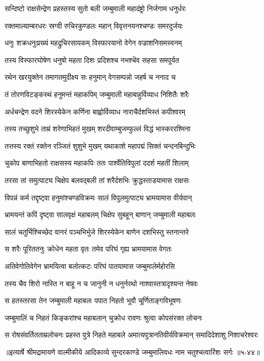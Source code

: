 
\twolineshloka
{सन्दिष्टो राक्षसेन्द्रेण प्रहस्तस्य सुतो बली}
{जम्बुमाली महादंष्ट्रो निर्जगाम धनुर्धरः} %

\twolineshloka
{रक्तमाल्याम्बरधरः स्रग्वी रुचिरकुण्डलः}
{महान् विवृत्तनयनश्चण्डः समरदुर्जयः} %

\twolineshloka
{धनुः शक्रधनुःप्रख्यं महद्रुचिरसायकम्}
{विस्फारयानो वेगेन वज्राशनिसमस्वनम्} %

\twolineshloka
{तस्य विस्फारघोषेण धनुषो महता दिशः}
{प्रदिशश्च नभश्चॆव सहसा समपूर्यत} %

\twolineshloka
{रथेन खरयुक्तेन तमागतमुदीक्ष्य सः}
{हनुमान् वेगसम्पन्नो जहर्ष च ननाद च} %

\twolineshloka
{तं तोरणविटङ्कस्थं हनुमन्तं महाकपिम्}
{जम्बुमाली महाबाहुर्विव्याध निशितैः शरैः} %

\twolineshloka
{अर्धचन्द्रेण वदने शिरस्येकेन कर्णिना}
{बाह्वोर्विव्याध नाराचैर्दशभिस्तं कपीश्वरम्} %

\twolineshloka
{तस्य तच्छुशुभे ताम्रं शरेणाभिहतं मुखम्}
{शरदीवाम्बुजम्फुल्लं विद्धं भास्कररश्मिना} %

\twolineshloka
{तत्तस्य रक्तं रक्तेन रञ्जितं शुशुभे मुखम्}
{यथाकाशे महापद्मं सिक्तं चन्दनबिन्दुभिः} %

\twolineshloka
{चुकोप बाणाभिहतो राक्षसस्य महाकपिः}
{ततः पार्श्वेतिविपुलां ददर्श महतीं शिलाम्} %

\twolineshloka
{तरसा तां समुत्पाट्य चिक्षेप बलवद्बली}
{तां शरैर्दशभिः क्रुद्धस्ताडयामास राक्षसः} %

\twolineshloka
{विपन्नं कर्म तद्दृष्ट्वा हनुमांश्चण्डविक्रमः}
{सालं विपुलमुत्पाट्य भ्रामयामास वीर्यवान्} %

\twolineshloka
{भ्रामयन्तं कपिं दृष्ट्वा सालवृक्षं महाबलम्}
{चिक्षेप सुबहून् बाणान् जम्बुमाली महाबलः} %

\twolineshloka
{सालं चतुर्भिश्चिच्छेद वानरं पञ्चभिर्भुजे}
{शिरस्येकेन बाणेन दशभिस्तु स्तनान्तरे} %

\twolineshloka
{स शरैः पूरिततनुः क्रोधेन महता वृतः}
{तमेव परिघं गृह्य भ्रामयामास वेगतः} %

\twolineshloka
{अतिवेगोतिवेगेन भ्रामयित्वा बलोत्कटः}
{परिघं पातयामास जम्बुमालेर्महोरसि} %

\twolineshloka
{तस्य चैव शिरो नास्ति न बाहू न च जानुनी}
{न धनुर्नरथो नाश्वास्तत्रादृश्यन्त नेषवः} %

\twolineshloka
{स हतस्तरसा तेन जम्बुमाली महाबलः}
{पपात निहतो भूवौ चूर्णिताङ्गविभूषणः} %

\twolineshloka
{जम्बुमालिं च निहतं किङ्करांश्च महाबलान्}
{चुक्रोध रावणः श्रुत्वा कोपसंरक्त लोचनः} %

\twolineshloka
{स रोषसंवर्तितताम्रलोचनः प्रहस्त पुत्रे निहते महाबले}
{अमात्यपुत्रानतिवीर्यविक्रमान् समादिदेशाशु निशाचरेश्वरः} %


॥इत्यार्षे श्रीमद्रामायणे वाल्मीकीये आदिकाव्ये सुन्दरकाण्डे जम्बुमालिवधः नाम चतुश्चत्वारिंशः सर्गः ॥५-४४॥
